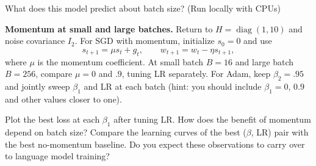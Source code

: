 \begin{problem}{What does this model predict about batch size? (Run locally with CPUs)}
\begin{parts}
\item \textbf{Momentum at small and large batches.}
Return to $H=\operatorname{diag}(1,10)$ and noise covariance $I_2$.
For SGD with momentum, initialize $s_0=0$ and use
\[
 s_{t+1}=\mu s_t+g_t,\qquad w_{t+1}=w_t-\eta s_{t+1},
\]
where $\mu$ is the momentum coefficient.
At small batch $B=16$ and large batch $B=256$, compare $\mu=0$ and $.9$,
tuning LR separately. For Adam, keep $\beta_2=.95$ and jointly sweep
$\beta_1$ and LR at each batch (hint: you should include $\beta_{1}=0$, $0.9$ and other values closer to one).

Plot the best loss at each $\beta_1$ after tuning LR.
How does the benefit of momentum depend on batch size? Compare the learning
curves of the best ($\beta$, LR) pair with the best no-momentum baseline. Do you expect these observations to carry over to language model training?

\end{parts}
\end{problem}

